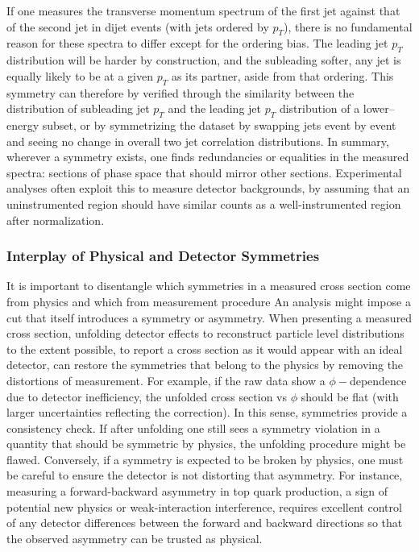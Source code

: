             If one measures the transverse momentum spectrum of the first jet against that of the second jet in dijet events (with jets ordered by $p_T$), there is no fundamental reason for these spectra to differ except for the ordering bias.
            The leading jet $p_T$ distribution will be harder by construction, and the subleading softer, any jet is equally likely to be at a given $p_T$ as its partner, aside from that ordering.
            This symmetry can therefore by verified through the similarity between the distribution of subleading jet $p_T$ and the leading jet $p_T$ distribution of a lower--energy subset, or by symmetrizing the dataset by swapping jets event by event and seeing no change in overall two jet correlation distributions.
            In summary, wherever a symmetry exists, one finds redundancies or equalities in the measured spectra: sections of phase space that should mirror other sections.
            Experimental analyses often exploit this to measure detector backgrounds, by assuming that an uninstrumented region should have similar counts as a well-instrumented region after normalization.

        \subsubsection{Interplay of Physical and Detector Symmetries}
            It is important to disentangle which symmetries in a measured cross section come from physics and which from measurement procedure
            An analysis might impose a cut that itself introduces a symmetry or asymmetry.
            When presenting a measured cross section, unfolding detector effects to reconstruct particle level distributions to the extent possible, to report a cross section as it would appear with an ideal detector, can restore the symmetries that belong to the physics by removing the distortions of measurement.
            For example, if the raw data show a $\phi-$dependence due to detector inefficiency, the unfolded cross section vs $\phi$ should be flat (with larger uncertainties reflecting the correction).
            In this sense, symmetries provide a consistency check.
            If after unfolding one still sees a symmetry violation in a quantity that should be symmetric by physics, the unfolding procedure might be flawed.
            Conversely, if a symmetry is expected to be broken by physics, one must be careful to ensure the detector is not distorting that asymmetry.
            For instance, measuring a forward-backward asymmetry in top quark production, a sign of potential new physics or weak-interaction interference, requires excellent control of any detector differences between the forward and backward directions so that the observed asymmetry can be trusted as physical.

